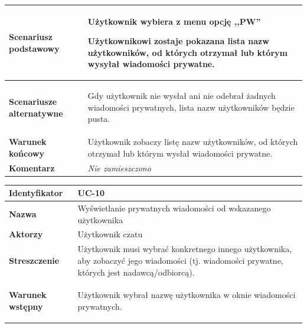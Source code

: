 {\begin{tabular}{ | l | l | }
	\hline
		\textbf{Scenariusz podstawowy} & \parbox[t]{11cm}{
			\begin{enumreq}
				\item Użytkownik wybiera z menu opcję ,,PW''
				\item Użytkownikowi zostaje pokazana lista nazw użytkowników,	od których
				otrzymał lub którym wysyłał wiadomości prywatne.
			\end{enumreq}
		}
		\\

	\hline
		\textbf{Scenariusze alternatywne} & \parbox[t]
		{11cm}{
			\begin{enumreq}
				\item Gdy użytkownik nie wysłał ani nie odebrał żadnych wiadomości
				prywatnych, lista nazw użytkowników będzie pusta.
			\end{enumreq}
		}
		\\

	\hline
		\textbf{Warunek końcowy} & \parbox[t]{11cm}{
			Użytkownik zobaczy listę nazw użytkowników, od których otrzymał lub którym
			wysłał wiadomości prywatne.
		}
		\\

	\hline
		\textbf{Komentarz} & \parbox[t]{11cm}{
			\textit{Nie zamieszczono}
		}
		\\

	\hline
\end{tabular}

\vspace{2em}

\begin{tabular}{ | l | l | }
	\hline
		\textbf{Identyfikator} &
		UC-10
		\\

	\hline
		\textbf{Nazwa} &
		Wyświetlanie prywatnych wiadomości od wskazanego użytkownika
		\\

	\hline
		\textbf{Aktorzy} & \parbox[t]{11cm}{
			Użytkownik czatu
		}\\

	\hline
		\textbf{Streszczenie} & \parbox[t]{11cm}{
			Użytkownik musi wybrać konkretnego innego użytkownika, aby zobaczyć jego
			wiadomości (tj. wiadomości prywatne, których jest nadawcą/odbiorcą).

		}\\

	\hline
		\textbf{Warunek wstępny} & \parbox[t]{11cm}{
			\begin{enumreq}
				\item Użytkownik wybrał nazwę użytkownika w oknie wiadomości prywatnych.
			\end{enumreq}

}
\end{tabular}}
